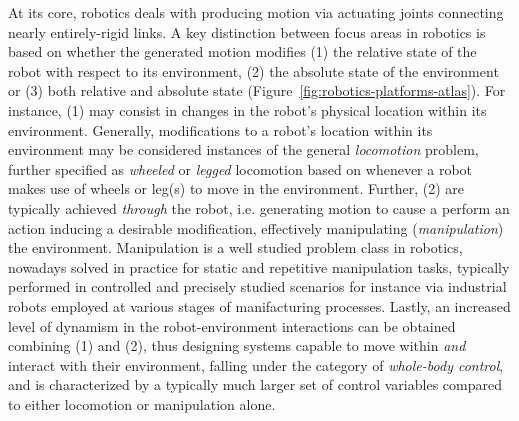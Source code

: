 At its core, robotics deals with producing motion via actuating joints connecting nearly entirely-rigid links. 
A key distinction between focus areas in robotics is based on whether the generated motion modifies (1) the relative state of the robot with respect to its environment, (2) the absolute state of the environment or (3) both relative and absolute state (Figure~\ref{fig:robotics-platforms-atlas}).
For instance, (1) may consist in changes in the robot's physical location within its environment. 
Generally, modifications to a robot's location within its environment may be considered instances of the general \emph{locomotion} problem, further specified as \emph{wheeled} or \emph{legged} locomotion based on whenever a robot makes use of wheels or leg(s) to move in the environment.
Further, (2) are typically achieved \emph{through} the robot, i.e. generating motion to cause a perform an action inducing a desirable modification, effectively manipulating (\emph{manipulation}) the environment. 
Manipulation is a well studied problem class in robotics, nowadays solved in practice for static and repetitive manipulation tasks, typically performed in controlled and precisely studied scenarios for instance via industrial robots employed at various stages of manifacturing processes.
Lastly, an increased level of dynamism in the robot-environment interactions can be obtained combining (1) and (2), thus designing systems capable to move within \emph{and} interact with their environment, falling under the category of \emph{whole-body control}, and is characterized by a typically much larger set of control variables compared to either locomotion or manipulation alone.

